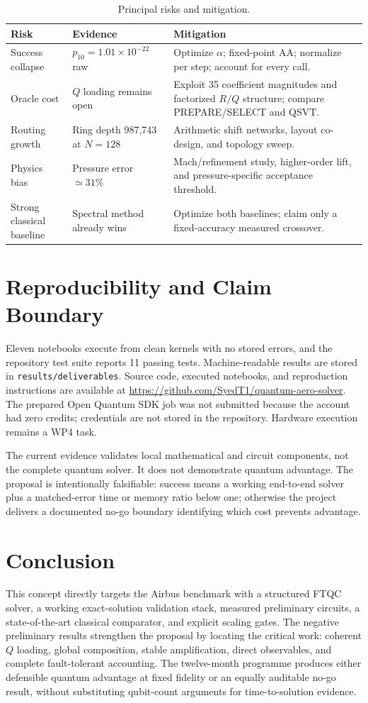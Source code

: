 \documentclass[10pt,twocolumn]{article}
\begin{document}
\begin{table}[!ht]
\centering
\caption{Principal risks and mitigation.}
\label{tab:risks}
\scriptsize
\begin{tabularx}{\columnwidth}{@{}p{18mm}p{26mm}X@{}}
\toprule Risk&Evidence&Mitigation\\\midrule
Success collapse&$p_{10}=1.01\times10^{-22}$ raw&Optimize $\alpha$; fixed-point
AA; normalize per step; account for every call.\\
Oracle cost&$Q$ loading remains open&Exploit 35 coefficient magnitudes and
factorized $R/Q$ structure; compare PREPARE/SELECT and QSVT.\\
Routing growth&Ring depth 987,743 at $N=128$&Arithmetic shift networks,
layout co-design, and topology sweep.\\
Physics bias&Pressure error $\simeq31\%$&Mach/refinement study, higher-order
lift, and pressure-specific acceptance threshold.\\
Strong classical baseline&Spectral method already wins&Optimize both baselines;
claim only a fixed-accuracy measured crossover.\\\bottomrule
\end{tabularx}
\end{table}

\section{Reproducibility and Claim Boundary}
Eleven notebooks execute from clean kernels with no stored errors, and the
repository test suite reports 11 passing tests. Machine-readable results are
stored in \texttt{results/deliverables}. Source code, executed notebooks, and
reproduction instructions are available at
\url{https://github.com/SyedT1/quantum-aero-solver}. The prepared Open Quantum SDK job was
not submitted because the account had zero credits; credentials are not stored
in the repository. Hardware execution remains a WP4 task.

The current evidence validates local mathematical and circuit components, not
the complete quantum solver. It does not demonstrate quantum advantage. The
proposal is intentionally falsifiable: success means a working end-to-end
solver plus a matched-error time or memory ratio below one; otherwise the
project delivers a documented no-go boundary identifying which cost prevents
advantage.

\section{Conclusion}
This concept directly targets the Airbus benchmark with a structured FTQC
solver, a working exact-solution validation stack, measured preliminary
circuits, a state-of-the-art classical comparator, and explicit scaling gates.
The negative preliminary results strengthen the proposal by locating the
critical work: coherent $Q$ loading, global composition, stable amplification,
direct observables, and complete fault-tolerant accounting. The twelve-month
programme produces either defensible quantum advantage at fixed fidelity or an
equally auditable no-go result, without substituting qubit-count arguments for
time-to-solution evidence.
\end{document}

